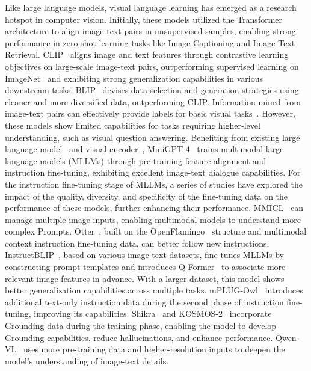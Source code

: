 \documentclass[10pt,twocolumn,letterpaper]{article}
\begin{document}
Like large language models, visual language learning has emerged as a research hotspot in computer vision. Initially, these models utilized the Transformer architecture to align image-text pairs in unsupervised samples, enabling strong performance in zero-shot learning tasks like Image Captioning and Image-Text Retrieval. CLIP~\cite{radford2021learning} aligns image and text features through contrastive learning objectives on large-scale image-text pairs, outperforming supervised learning on ImageNet~\cite{deng2009imagenet} and exhibiting strong generalization capabilities in various downstream tasks. BLIP~\cite{li2022blip} devises data selection and generation strategies using cleaner and more diversified data, outperforming CLIP. Information mined from image-text pairs can effectively provide labels for basic visual tasks~\cite{li2021grounded,zhang2022glipv2,liu2023grounding}. However, these models show limited capabilities for tasks requiring higher-level understanding, such as visual question answering. Benefiting from existing large language model~\cite{vicuna2023} and visual encoder~\cite{fang2023eva}, MiniGPT-4~\cite{zhu2023minigpt} trains multimodal large language models (MLLMs) through pre-training feature alignment and instruction fine-tuning, exhibiting excellent image-text dialogue capabilities. For the instruction fine-tuning stage of MLLMs, a series of studies \cite{liu2023visual,wang2023vigc,zhao2023mllm} have explored the impact of the quality, diversity, and specificity of the fine-tuning data on the performance of these models, further enhancing their performance. 
MMICL~\cite{zhao2023mmicl} can manage multiple image inputs, enabling multimodal models to understand more complex Prompts. Otter~\cite{li2023otter}, built on the OpenFlamingo~\cite{awadalla2023openflamingo} structure and multimodal context instruction fine-tuning data, can better follow new instructions. InstructBLIP~\cite{dai2023instructblip}, based on various image-text datasets, fine-tunes MLLMs by constructing prompt templates and introduces Q-Former~\cite{li2022blip} to associate more relevant image features in advance. With a larger dataset, this model shows better generalization capabilities across multiple tasks. mPLUG-Owl~\cite{ye2023mplug} introduces additional text-only instruction data during the second phase of instruction fine-tuning, improving its capabilities. Shikra~\cite{chen2023shikra} and KOSMOS-2~\cite{peng2023kosmos} incorporate Grounding data during the training phase, enabling the model to develop Grounding capabilities, reduce hallucinations, and enhance performance. Qwen-VL~\cite{bai2023qwen} uses more pre-training data and higher-resolution inputs to deepen the model's understanding of image-text details.
\end{document}
